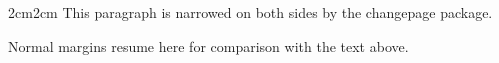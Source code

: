 \documentclass{article}
\begin{document}
\begin{adjustwidth}{2cm}{2cm}
This paragraph is narrowed on both sides by the changepage package.
\end{adjustwidth}
Normal margins resume here for comparison with the text above.
\end{document}

